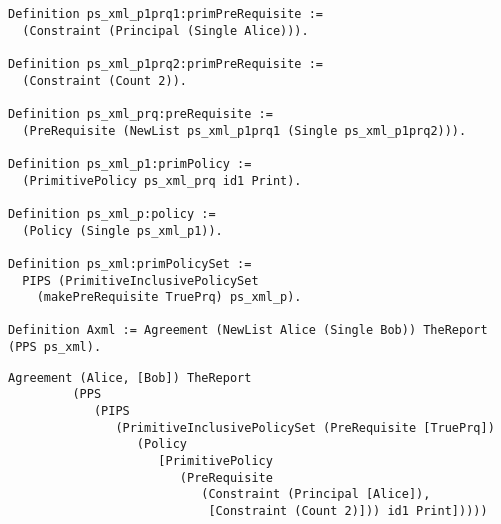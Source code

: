 \begin{minipage}[c]{0.95\textwidth}
\begin{lstlisting}
Definition ps_xml_p1prq1:primPreRequisite := 
  (Constraint (Principal (Single Alice))).

Definition ps_xml_p1prq2:primPreRequisite := 
  (Constraint (Count 2)).

Definition ps_xml_prq:preRequisite := 
  (PreRequisite (NewList ps_xml_p1prq1 (Single ps_xml_p1prq2))).

Definition ps_xml_p1:primPolicy := 
  (PrimitivePolicy ps_xml_prq id1 Print).

Definition ps_xml_p:policy := 
  (Policy (Single ps_xml_p1)).

Definition ps_xml:primPolicySet :=
  PIPS (PrimitiveInclusivePolicySet
    (makePreRequisite TruePrq) ps_xml_p).

Definition Axml := Agreement (NewList Alice (Single Bob)) TheReport (PPS ps_xml).
\end{lstlisting}
\end{minipage} 

\begin{minipage}[c]{0.95\textwidth}
\begin{lstlisting}
Agreement (Alice, [Bob]) TheReport
         (PPS
            (PIPS
               (PrimitiveInclusivePolicySet (PreRequisite [TruePrq])
                  (Policy
                     [PrimitivePolicy
                        (PreRequisite
                           (Constraint (Principal [Alice]),
                            [Constraint (Count 2)])) id1 Print]))))

\end{lstlisting}
\end{minipage} 





